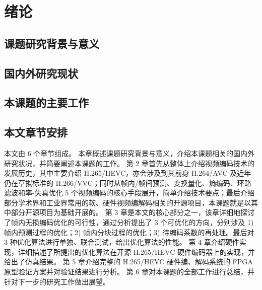 \chapter{绪论}
\label{cha:c1}

\section{课题研究背景与意义}

\section{国内外研究现状}

\section{本课题的主要工作}

\section{本文章节安排}
本文由 6 个章节组成。
本章概述课题研究背景与意义，介绍本课题相关的国内外研究状况，并简要阐述本课题的工作。
第 2 章首先从整体上介绍视频编码技术的发展历史，其中主要介绍 H.265/HEVC，亦会涉及到其前身 H.264/AVC 及近年仍在草拟标准的 H.266/VVC；同时从帧内/帧间预测、变换量化、熵编码、环路滤波和率-失真优化 5 个视频编码的核心手段展开，简单介绍技术要点；最后介绍部分学术界和工业界常用的软、硬件视频编解码相关的开源项目，本课题就是以其中部分开源项目为基础开展的。
第 3 章是本文的核心部分之一，该章详细地探讨了帧内无损编码优化的可行性，通过分析提出了 3 个可优化的方向，分别涉及 1) 帧内预测过程的优化；2) 帧内分块过程的优化；3) 待编码系数的再处理。最后对 3 种优化算法进行单独、联合测试，给出优化算法的性能。
第 4 章介绍硬件实现，详细描述了所提出的优化算法在开源 H.265/HEVC 硬件编码器上的实现，并给出了仿真结果。
第 5 章介绍完整的 H.265/HEVC 硬件编、解码系统的 FPGA 原型验证方案并对验证结果进行分析。
第 6 章对本课题的全部工作进行总结，并针对下一步的研究工作做出展望。
